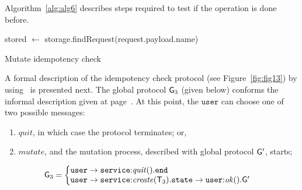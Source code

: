 Algorithm~\ref{alg:alg6} describes steps required to test if the operation is done before.

\begin{algorithm}[H]
	\Fn{\equals{stored, topology}}{
		sChildren $\leftarrow$ stored.children\\
		tChildren $\leftarrow$ topology.children\\
		\If{topology $==$ \textsc{null} $\lor$ tChildren.size $\neq$ sChildren.size \\ $\lor$ $\neg$ stored.isIdempotent(topology.data)}{
			\KwRet{false}
		}
	
		\While{sChildren.hasNext $\land$ tChildren.hasNext}{
			\If{$\neg$ equals(sChildren.next, tChildren.next)}{
				\KwRet{false}
			}
		}
		\KwRet{true}
	}
	
	\SetAlgoLined
	stored $\leftarrow$ storage.findRequest(request.payload.name)\\
	\caption{Mutate idempotency check}
	\label{alg:alg6}
\end{algorithm}

\noindent
A formal description of the idempotency check protocol (see Figure~\ref{fig:fig13}) by using~\cite{HuY17} is presented next. The global protocol ${\sf G}_3$ (given below) conforms the informal description given at page~\pageref{informal_description_idempotency}. At this point, the $\mathtt{user}$ can choose one of two possible messages: 

\begin{enumerate}[start=1,label={(\bfseries \arabic*)}]
\item $\mathit{quit}$, in which case the protocol terminates; or, 
\item $\mathit{mutate}$, and the mutation process, described with global protocol ${\sf G}'$, starts;
\end{enumerate}
\begin{align*}
\G_3 & = 
\left\{
\begin{array}{@{}l@{}}  
\mathtt{user}\to\mathtt{service}{:} \mathit{quit}().\tend\\
\mathtt{user} \to \mathtt{service}{:}\mathit{create}(\T_3).
\mathtt{state} \to \mathtt{user}{:}\mathit{ok}().\G'
\end{array} \right.
\end{align*}


